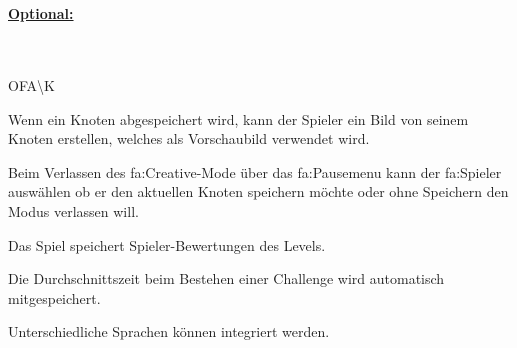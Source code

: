 ~\\


%
%
\paragraph*{\underline{Optional:}}~\\


\begin{ids}{\gls{OFA\K}}

	\id[ 480] Wenn ein Knoten abgespeichert wird, kann der Spieler ein Bild von seinem Knoten erstellen, welches als Vorschaubild verwendet wird.
	
	\id[ 490] Beim Verlassen des \gls{fa:Creative}-Mode über das \gls{fa:Pausemenu}  kann der \gls{fa:Spieler} auswählen ob er den aktuellen Knoten speichern möchte oder ohne Speichern den Modus verlassen will.
	
	\id[ 500] Das Spiel speichert Spieler-Bewertungen des Levels.
	
	\id[ 510] Die Durchschnittszeit beim Bestehen einer Challenge wird automatisch mitgespeichert. %
	
	\id[ 520] Unterschiedliche Sprachen können integriert werden.
	
\end{ids}

~\\